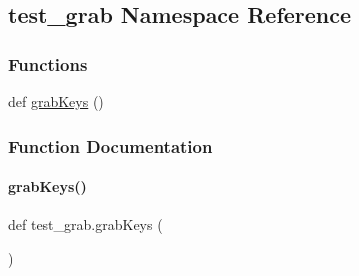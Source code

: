 \hypertarget{namespacetest__grab}{}\subsection{test\+\_\+grab Namespace Reference}
\label{namespacetest__grab}
\subsubsection*{Functions}
\begin{DoxyCompactItemize}
\item 
def \hyperlink{namespacetest__grab_ad0b4094443e62f932259a861cf858dff}{grab\+Keys} ()
\end{DoxyCompactItemize}


\subsubsection{Function Documentation}
\mbox{\label{namespacetest__grab_ad0b4094443e62f932259a861cf858dff}} 
\paragraph{\texorpdfstring{grab\+Keys()}{grabKeys()}}
{\footnotesize\ttfamily def test\+\_\+grab.\+grab\+Keys (\begin{DoxyParamCaption}{ }\end{DoxyParamCaption})}

